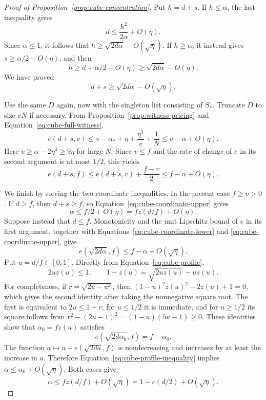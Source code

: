\begin{proof}[Proof of Proposition~\ref{prop:cube-concentration}]
Put \(h=d+s\). If \(h\le\alpha\), the last inequality gives
\[
 d\le \frac{h^2}{2\alpha}+O(\eta).
\]
Since \(\alpha\le1\), it follows that
\(h\ge\sqrt{2d\alpha}-O(\sqrt\eta)\). If \(h\ge\alpha\), it instead
gives \(s\ge\alpha/2-O(\eta)\), and then
\[
 h\ge d+\alpha/2-O(\eta)
   \ge\sqrt{2d\alpha}-O(\eta).
\]
We have proved
\begin{equation}\label{eq:cube-coordinate-lower}
 d+s\ge\sqrt{2d\alpha}-O(\sqrt\eta).
\end{equation}

Use the same \(D\) again, now with the singleton list consisting of
\(S_*\). Truncate \(D\) to size \(vN\) if necessary. From
Proposition~\ref{prop:witness-pricing} and
Equation~\eqref{eq:cube-full-witness},
\[
 e(d+s,v)
 \le v-\alpha_*+\eta+\frac{\eta^3}{v}+\frac1N
 \le v-\alpha+O(\eta).
\]
Here \(v\ge\alpha-2\eta^3\ge9\eta\) for large \(N\). Since \(v\le f\)
and the rate of change of \(e\) in its second argument is at most
\(1/2\), this yields
\begin{equation}\label{eq:cube-coordinate-upper}
 e(d+s,f)
 \le e(d+s,v)+\frac{f-v}{2}
 \le f-\alpha+O(\eta).
\end{equation}

We finish by solving the two coordinate inequalities. In the present
case \(f\ge v>0\). If \(d\ge f\), then \(d+s\ge f\), so
Equation~\eqref{eq:cube-coordinate-upper} gives
\[
 \alpha\le f/2+O(\eta)=fz(d/f)+O(\eta).
\]
Suppose instead that \(d\le f\). Monotonicity and the unit Lipschitz
bound of \(e\) in its first argument, together with
Equations~\eqref{eq:cube-coordinate-lower} and
\eqref{eq:cube-coordinate-upper}, give
\begin{equation}\label{eq:cube-profile-inequality}
 e(\sqrt{2d\alpha},f)\le f-\alpha+O(\sqrt\eta).
\end{equation}
Put \(u=d/f\in[0,1]\). Directly from
Equation~\eqref{eq:cube-profile},
\[
 2uz(u)\le1,\qquad
 1-z(u)=\sqrt{2uz(u)}-uz(u).
\]
For completeness, if \(r=\sqrt{2u-u^2}\), then
\((1-u)^2z(u)^2-2z(u)+1=0\), which gives the second identity after
taking the nonnegative square root. The first is equivalent to
\(2u\le1+r\); for \(u\le1/2\) it is immediate, and for
\(u\ge1/2\) its square follows from
\(r^2-(2u-1)^2=(1-u)(5u-1)\ge0\). These identities show that
\(\alpha_0=fz(u)\) satisfies
\[
 e(\sqrt{2d\alpha_0},f)=f-\alpha_0.
\]
The function \(a\mapsto a+e(\sqrt{2da},f)\) is nondecreasing and
increases by at least the increase in \(a\). Therefore
Equation~\eqref{eq:cube-profile-inequality} implies
\(\alpha\le\alpha_0+O(\sqrt\eta)\). Both cases give
\[
 \alpha\le fz(d/f)+O(\sqrt\eta)
          =1-c(d/2)+O(\sqrt\eta).
\]


\end{proof}
